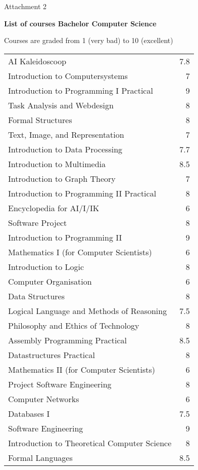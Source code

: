 \documentclass[a4paper,11pt]{article}
\begin{document}
\begin{cv}{}
\pagebreak


\begin{cvlist}{Attachment 2}
  \item {\bf List of courses Bachelor Computer Science}
  \item Courses are graded from 1 (very bad) to 10 (excellent)
  \item
  \begin{tabular}{p{23em}d}
    AI Kaleidoscoop & 7.8\\
    Introduction to Computersystems & 7\\
    Introduction to Programming I Practical & 9\\
    Task Analysis and Webdesign & 8\\
    Formal Structures & 8\\
    Text, Image, and Representation & 7\\
    Introduction to Data Processing & 7.7\\
    Introduction to Multimedia & 8.5\\
    Introduction to Graph Theory & 7\\
    Introduction to Programming II Practical & 8\\
    Encyclopedia for AI/I/IK & 6\\
    Software Project & 8\\
    Introduction to Programming II & 9\\
    Mathematics I (for Computer Scientists) & 6\\
    Introduction to Logic & 8\\
    Computer Organisation & 6\\
    Data Structures & 8\\
    Logical Language and Methods of Reasoning & 7.5\\
    Philosophy and Ethics of Technology & 8\\
    Assembly Programming Practical & 8.5\\
    Datastructures Practical & 8\\
    Mathematics II (for Computer Scientists) & 6\\
    Project Software Engineering & 8\\
    Computer Networks & 6\\
    Databases I & 7.5\\
    Software Engineering & 9\\
    Introduction to Theoretical Computer Science & 8\\
    Formal Languages & 8.5\\

\end{tabular}
\end{cvlist}
\end{cv}
\end{document}
